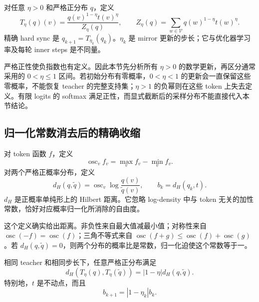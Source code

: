 \documentclass[lang=cn,scheme=chinese,openany]{../book/elegantbook}
\begin{document}
\begin{definition}
对任意 $\eta>0$ 和严格正分布 $q$，定义
\begin{equation*}
 T_\eta(q)(v)
 =\frac{q(v)^{1-\eta}t(v)^\eta}{Z_\eta(q)},
 \qquad
 Z_\eta(q)=\sum_{w\in\mathcal V}q(w)^{1-\eta}t(w)^\eta.
\end{equation*}
精确 hard sync 是 $q_{k+1}=T_{\eta_k}(q_k)$。$\eta_k$ 是 mirror 更新的步长；它与优化器学习率及每轮 inner steps 是不同量。
\end{definition}

严格正性使负指数也有定义。因此本节先分析所有 $\eta>0$ 的数学更新，再区分通常采用的 $0<\eta\leq1$ 区间。若初始分布有零概率，$0<\eta<1$ 的更新会一直保留这些零概率，不能恢复 teacher 的完整支持集；$\eta>1$ 的负幂则在这些 token 上失去定义。有限 logits 的 softmax 满足正性，而显式截断后的采样分布不能直接代入本节结论。

\subsection{归一化常数消去后的精确收缩}

\begin{definition}
对 token 函数 $f$，定义
\begin{equation*}
 \operatorname{osc}_v f_v=\max_v f_v-\min_v f_v.
\end{equation*}
对两个严格正概率分布，定义
\begin{equation*}
 d_H(q,\widetilde q)
 =\operatorname{osc}_v\log\frac{q(v)}{\widetilde q(v)},
 \qquad b_k=d_H(q_k,t).
\end{equation*}
$d_H$ 是正概率单纯形上的 Hilbert 距离。它忽略 log-density 中与 token 无关的加性常数，恰好对应概率归一化所消除的自由度。
\end{definition}

这个定义确实给出距离。非负性来自最大值减最小值；对称性来自 $\operatorname{osc}(-f)=\operatorname{osc}(f)$；三角不等式来自 $\operatorname{osc}(f+g)\leq\operatorname{osc}(f)+\operatorname{osc}(g)$。若 $d_H(q,\widetilde q)=0$，则两个分布的概率比是常数，归一化迫使这个常数等于一。

\begin{theorem}
\label{dyn:thm:hs-pairwise-contraction}
相同 teacher 和相同步长下，任意严格正分布满足
\begin{equation}\label{dyn:eq:hs-pairwise-contraction}
 d_H(T_\eta(q),T_\eta(\widetilde q))
 =|1-\eta|d_H(q,\widetilde q).
\end{equation}
特别地，$t$ 是不动点，而且
\begin{equation*}
 b_{k+1}=|1-\eta_k|b_k.
\end{equation*}
\end{theorem}
\end{document}
